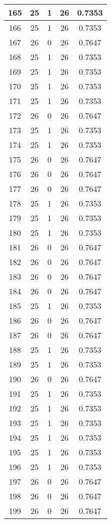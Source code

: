 \documentclass[letterpaper, 12pt]{article}
\begin{document}
\begin{longtable}{|c|c|c|c|c|}
\hline
165 & 25 & 1 & 26 & 0.7353 \\
\hline
166 & 25 & 1 & 26 & 0.7353 \\
\hline
167 & 26 & 0 & 26 & 0.7647 \\
\hline
168 & 25 & 1 & 26 & 0.7353 \\
\hline
169 & 25 & 1 & 26 & 0.7353 \\
\hline
170 & 25 & 1 & 26 & 0.7353 \\
\hline
171 & 25 & 1 & 26 & 0.7353 \\
\hline
172 & 26 & 0 & 26 & 0.7647 \\
\hline
173 & 25 & 1 & 26 & 0.7353 \\
\hline
174 & 25 & 1 & 26 & 0.7353 \\
\hline
175 & 26 & 0 & 26 & 0.7647 \\
\hline
176 & 26 & 0 & 26 & 0.7647 \\
\hline
177 & 26 & 0 & 26 & 0.7647 \\
\hline
178 & 25 & 1 & 26 & 0.7353 \\
\hline
179 & 25 & 1 & 26 & 0.7353 \\
\hline
180 & 25 & 1 & 26 & 0.7353 \\
\hline
181 & 26 & 0 & 26 & 0.7647 \\
\hline
182 & 26 & 0 & 26 & 0.7647 \\
\hline
183 & 26 & 0 & 26 & 0.7647 \\
\hline
184 & 26 & 0 & 26 & 0.7647 \\
\hline
185 & 25 & 1 & 26 & 0.7353 \\
\hline
186 & 26 & 0 & 26 & 0.7647 \\
\hline
187 & 26 & 0 & 26 & 0.7647 \\
\hline
188 & 25 & 1 & 26 & 0.7353 \\
\hline
189 & 25 & 1 & 26 & 0.7353 \\
\hline
190 & 26 & 0 & 26 & 0.7647 \\
\hline
191 & 25 & 1 & 26 & 0.7353 \\
\hline
192 & 25 & 1 & 26 & 0.7353 \\
\hline
193 & 25 & 1 & 26 & 0.7353 \\
\hline
194 & 25 & 1 & 26 & 0.7353 \\
\hline
195 & 25 & 1 & 26 & 0.7353 \\
\hline
196 & 25 & 1 & 26 & 0.7353 \\
\hline
197 & 26 & 0 & 26 & 0.7647 \\
\hline
198 & 26 & 0 & 26 & 0.7647 \\
\hline
199 & 26 & 0 & 26 & 0.7647 \\
\hline
\end{longtable}
\end{document}
